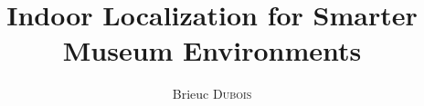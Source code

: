 \documentclass{cover/EPL-master-thesis-covers-EN}
\title{Indoor Localization for Smarter Museum Environments}
\author{Brieuc \textsc{Dubois}}
\begin{document}
  \maketitle

  
  
  
  
  
  
  
  
  
  

  
  

  \backcoverpage
\end{document}
